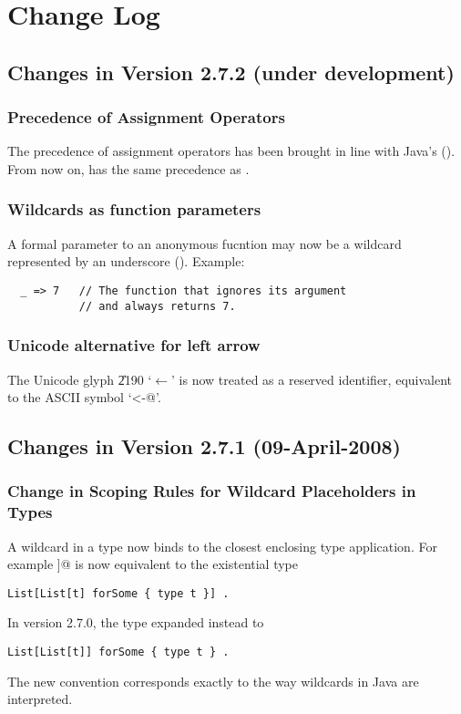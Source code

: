 
\chapter{Change Log}

\section*{Changes in Version 2.7.2 (under development)}

\subsection*{Precedence of Assignment Operators}

The precedence of assignment operators has been brought in line with Java's 
().
From now on, \code{+=} has the same precedence as \code{=}.

\subsection*{Wildcards as function parameters}

A formal parameter to an anonymous fucntion 
may now be a wildcard represented by an underscore (). Example:
\begin{lstlisting}
  _ => 7   // The function that ignores its argument
           // and always returns 7.
\end{lstlisting}

\subsection*{Unicode alternative for left arrow}

The Unicode glyph \U{2190} `$\leftarrow$' is now treated as a reserved
identifier, equivalent to the ASCII symbol `\lstinline@<-@'.


\section*{Changes in Version 2.7.1 (09-April-2008)}

\subsection*{Change in Scoping Rules for Wildcard Placeholders in Types}

A wildcard in a type now binds to the closest enclosing type application.
For example \lstinline@List[List[_]]@ is now equivalent to the existential type
\begin{lstlisting}
List[List[t] forSome { type t }] . 
\end{lstlisting}
In version 2.7.0, the type expanded instead to 
\begin{lstlisting}
List[List[t]] forSome { type t } .
\end{lstlisting}
The new convention corresponds exactly to the way wildcards in Java are interpreted.

